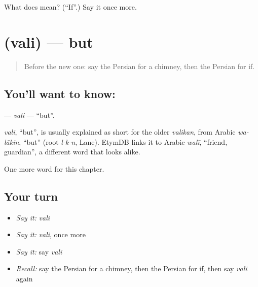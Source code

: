 \begin{tcolorbox}[breakable,colback=teal!4,colframe=teal!35!black,title={Before you move on}]
What does  mean? (\textquotedblleft{}If\textquotedblright{}.) Say it once more.
\end{tcolorbox}
\section[\texorpdfstring{\fa{ولی} (vali)}{ولی (vali)}]{ (vali) — but}

\label{lesson:FA-C158-vali}



\begin{quote}
Before the new one: say the Persian for a chimney, then the Persian for if.
\end{quote}

\subsection*{You'll want to know: }
\textbf{} — \emph{vali} — \textquotedblleft{}but\textquotedblright{}.

\begin{cousinweb}
\emph{vali}, \textquotedblleft{}but\textquotedblright{}, is usually explained as short for the older \emph{valikan}, from Arabic \emph{wa-lākin}, \textquotedblleft{}but\textquotedblright{} (root \emph{l-k-n}, Lane). EtymDB links it to Arabic \emph{walī}, \textquotedblleft{}friend, guardian\textquotedblright{}, a different word that looks alike.
\end{cousinweb}

\begin{grammarlens}[title={What you've built}]
One more word for this chapter.
\end{grammarlens}

\subsection*{Your turn}
\begin{itemize}
\raggedright
  \item \emph{Say it:} \emph{vali}
  \item \emph{Say it:} \emph{vali}, once more
  \item \emph{Say it:} say \emph{vali}
  \item \emph{Recall:} say the Persian for a chimney, then the Persian for if, then say \emph{vali} again
\end{itemize}

